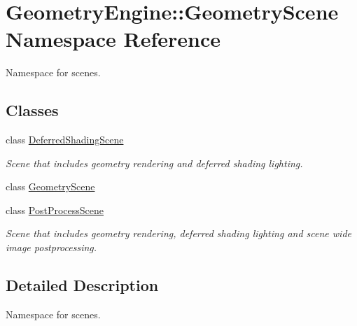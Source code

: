 \hypertarget{namespace_geometry_engine_1_1_geometry_scene}{}\section{Geometry\+Engine\+::Geometry\+Scene Namespace Reference}
\label{namespace_geometry_engine_1_1_geometry_scene}


Namespace for scenes.  


\subsection*{Classes}
\begin{DoxyCompactItemize}
\item 
class \mbox{\hyperlink{class_geometry_engine_1_1_geometry_scene_1_1_deferred_shading_scene}{Deferred\+Shading\+Scene}}
\begin{DoxyCompactList}\small\item\em Scene that includes geometry rendering and deferred shading lighting. \end{DoxyCompactList}\item 
class \mbox{\hyperlink{class_geometry_engine_1_1_geometry_scene_1_1_geometry_scene}{Geometry\+Scene}}
\item 
class \mbox{\hyperlink{class_geometry_engine_1_1_geometry_scene_1_1_post_process_scene}{Post\+Process\+Scene}}
\begin{DoxyCompactList}\small\item\em Scene that includes geometry rendering, deferred shading lighting and scene wide image postprocessing. \end{DoxyCompactList}\end{DoxyCompactItemize}


\subsection{Detailed Description}
Namespace for scenes. 